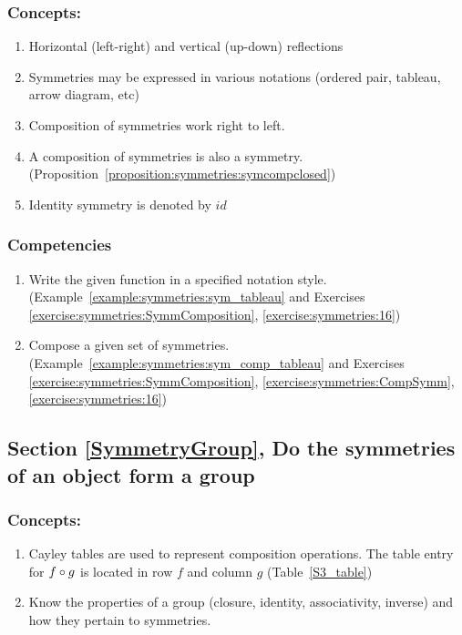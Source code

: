 \subsubsection*{Concepts:}
\begin{enumerate}
\item
Horizontal (left-right) and vertical (up-down) reflections
\item
Symmetries may be expressed in various notations (ordered pair, tableau, arrow diagram, etc)
\item
Composition of symmetries work right to left.
\item
A composition of symmetries is also a symmetry. (Proposition~\ref{proposition:symmetries:symcompclosed})
\item
Identity symmetry is denoted by $id$
\end{enumerate}

\subsubsection*{Competencies}
\begin{enumerate}
\item
Write the given function in a specified notation style. (Example~\ref{example:symmetries:sym_tableau} and Exercises \ref{exercise:symmetries:SymmComposition}, \ref{exercise:symmetries:16})
\item
Compose a given set of symmetries. (Example~\ref{example:symmetries:sym_comp_tableau} and Exercises \ref{exercise:symmetries:SymmComposition}, \ref{exercise:symmetries:CompSymm},  \ref{exercise:symmetries:16})
\end{enumerate}


\subsection*{Section \ref{SymmetryGroup}, Do the symmetries of an object form a group}
\subsubsection*{Concepts:}
\begin{enumerate}
\item 
Cayley tables are used to represent composition operations. The table entry for $f \circ g$ is located in row $f$ and column $g$ (Table~\ref{S3_table})
\item
Know the properties of a group (closure, identity, associativity, inverse) and how they pertain to symmetries.  
\end{enumerate}

